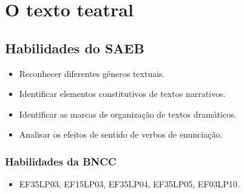 \chapter{O texto teatral}


\section*{Habilidades do SAEB}

\begin{itemize}
  \item Reconhecer diferentes gêneros textuais.
  \item Identificar elementos constitutivos de textos narrativos.
  \item Identificar as marcas de organização de textos dramáticos.
  \item Analisar os efeitos de sentido de verbos de enunciação.
\end{itemize}

\subsection{Habilidades da BNCC}

\begin{itemize}
  \item EF35LP03, EF15LP03, EF35LP04, EF35LP05, EF03LP10.
\end{itemize}

